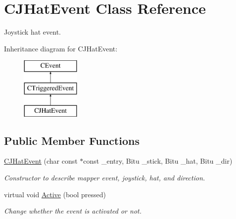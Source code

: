 \hypertarget{classCJHatEvent}{\section{C\-J\-Hat\-Event Class Reference}
\label{classCJHatEvent}
}


Joystick hat event.  


Inheritance diagram for C\-J\-Hat\-Event\-:\begin{figure}[H]
\begin{center}
\leavevmode
\includegraphics[height=3.000000cm]{classCJHatEvent}
\end{center}
\end{figure}
\subsection*{Public Member Functions}
\begin{DoxyCompactItemize}
\item 
\hypertarget{classCJHatEvent_a75c1276a13b233799993bb69bfbffedf}{\hyperlink{classCJHatEvent_a75c1276a13b233799993bb69bfbffedf}{C\-J\-Hat\-Event} (char const $\ast$const \-\_\-entry, Bitu \-\_\-stick, Bitu \-\_\-hat, Bitu \-\_\-dir)}\label{classCJHatEvent_a75c1276a13b233799993bb69bfbffedf}

\begin{DoxyCompactList}\small\item\em Constructor to describe mapper event, joystick, hat, and direction. \end{DoxyCompactList}\item 
\hypertarget{classCJHatEvent_ad4b66a30f706388e5568090963a22dee}{virtual void \hyperlink{classCJHatEvent_ad4b66a30f706388e5568090963a22dee}{Active} (bool pressed)}\label{classCJHatEvent_ad4b66a30f706388e5568090963a22dee}

\begin{DoxyCompactList}\small\item\em Change whether the event is activated or not. \end{DoxyCompactList}\end{DoxyCompactItemize}
